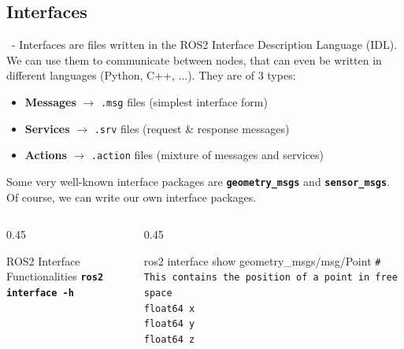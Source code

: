 \documentclass{beamer}
\begin{document}
\subsection{Interfaces}
\begin{frame}{\insertsection \ - \insertsubsection}
    Interfaces are files written in the ROS2 Interface Description Language (IDL). We can use them to communicate between nodes, that can even be written in different languages (Python, C++, ...). They are of 3 types:
    \begin{itemize}
        \item \textbf{Messages} $\rightarrow$ \texttt{.msg} files (simplest interface form)
        \item \textbf{Services} $\rightarrow$ \texttt{.srv} files (request \& response messages)
        \item \textbf{Actions} $\rightarrow$ \texttt{.action} files (mixture of messages and services)
    \end{itemize}
    Some very well-known interface packages are \textbf{\texttt{geometry\_msgs}} and \textbf{\texttt{sensor\_msgs}}. Of course, we can write our own interface packages.
    \begin{columns}[c]
        \begin{column}{0.45\textwidth}
            \begin{block}{ROS2 Interface Functionalities}
                \large \textbf{\texttt{ros2 interface -h}}
            \end{block}
        \end{column}
        \begin{column}{0.45\textwidth}
            \begin{block}{ros2 interface show geometry\_msgs/msg/Point}
                \small
                \texttt{\# This contains the position of a point in free space} \\
                \texttt{float64 x} \\
                \texttt{float64 y} \\
                \texttt{float64 z}
            \end{block}        
        \end{column}
    \end{columns}
\end{frame}
\end{document}
